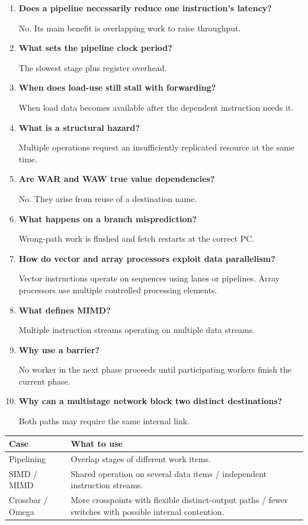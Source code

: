 \documentclass[12pt,a4paper]{article}
\newcommand{\Q}[1]{\textbf{#1}\par\noindent\ignorespaces}
\begin{document}
\begin{tcolorbox}[exambox,title={Frequently Asked / Viva Questions}]
\begin{enumerate}[topsep=0pt, label=\textbf{Q\arabic*.}, itemsep=5pt]
\item \Q{Does a pipeline necessarily reduce one instruction's latency?}
No. Its main benefit is overlapping work to raise throughput.
\item \Q{What sets the pipeline clock period?}
The slowest stage plus register overhead.
\item \Q{When does load-use still stall with forwarding?}
When load data becomes available after the dependent instruction needs it.
\item \Q{What is a structural hazard?}
Multiple operations request an insufficiently replicated resource at the same time.
\item \Q{Are WAR and WAW true value dependencies?}
No. They arise from reuse of a destination name.
\item \Q{What happens on a branch misprediction?}
Wrong-path work is flushed and fetch restarts at the correct PC.
\item \Q{How do vector and array processors exploit data parallelism?}
Vector instructions operate on sequences using lanes or pipelines. Array processors use multiple controlled processing elements.
\item \Q{What defines MIMD?}
Multiple instruction streams operating on multiple data streams.
\item \Q{Why use a barrier?}
No worker in the next phase proceeds until participating workers finish the current phase.
\item \Q{Why can a multistage network block two distinct destinations?}
Both paths may require the same internal link.
\end{enumerate}
\end{tcolorbox}
\begin{tcolorbox}[tikzbox,title={Summary comparison}]
\begin{tabularx}{\linewidth}{|B{4cm}|Y|}\hline
\textbf{Case} & \textbf{What to use} \\ \hline
Pipelining & Overlap stages of different work items. \\ \hline
SIMD / MIMD & Shared operation on several data items / independent instruction streams. \\ \hline
Crossbar / Omega & More crosspoints with flexible distinct-output paths / fewer switches with possible internal contention. \\ \hline
\end{tabularx}
\end{tcolorbox}
\end{document}
